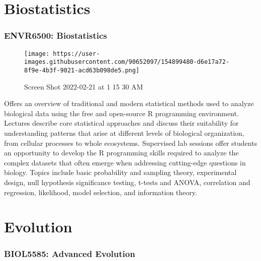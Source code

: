 \documentclass[
  letterpaper,
  DIV=11,
  numbers=noendperiod]{scrreprt}
\begin{document}
\hypertarget{biostatistics}{%
\section*{\texorpdfstring{\textbf{Biostatistics}}{Biostatistics}}\label{biostatistics}}

\hypertarget{envr6500-biostatistics}{%
\subsubsection*{\texorpdfstring{\textbf{ENVR6500:
Biostatistics}}{ENVR6500: Biostatistics}}\label{envr6500-biostatistics}}

\begin{figure}

{\centering \texttt{[image: https://user-images.githubusercontent.com/90652097/154899480-d6e17a72-8f9e-4b3f-9021-acd63b098de5.png]}

}

\caption{Screen Shot 2022-02-21 at 1 15 30 AM}

\end{figure}

Offers an overview of traditional and modern statistical methods used to
analyze biological data using the free and open-source R programming
environment. Lectures describe core statistical approaches and discuss
their suitability for understanding patterns that arise at different
levels of biological organization, from cellular processes to whole
ecosystems. Supervised lab sessions offer students an opportunity to
develop the R programming skills required to analyze the complex
datasets that often emerge when addressing cutting-edge questions in
biology. Topics include basic probability and sampling theory,
experimental design, null hypothesis significance testing, t-tests and
ANOVA, correlation and regression, likelihood, model selection, and
information theory.

\hypertarget{evolution}{%
\section*{\texorpdfstring{\textbf{Evolution}}{Evolution}}\label{evolution}}

\hypertarget{biol5585-advanced-evolution}{%
\subsubsection*{\texorpdfstring{\textbf{BIOL5585: Advanced
Evolution}}{BIOL5585: Advanced Evolution}}\label{biol5585-advanced-evolution}}
\end{document}
